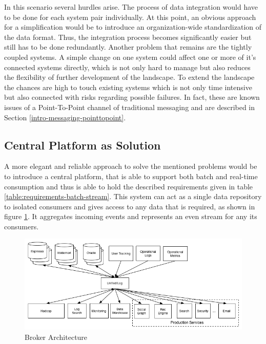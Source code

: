 In this scenario several hurdles arise. The process of data integration would
have to be done for each system pair individually. At this point, an obvious
approach for a simplification would be to introduce an organization-wide
standardization of the data format. Thus, the integration process becomes 
significantly easier but still has to be done redundantly. Another problem that
remains are the tightly coupled systems. A simple change on one system could
affect one or more of it's connected systems directly, which is not only hard to
manage but also reduces the flexibility of further development of the landscape.
To extend the landscape the chances are high to touch existing systems which is
not only time intensive but also connected with risks regarding possible
failures. In fact, these are known issues of a Point-To-Point channel of
traditional messaging and are described in Section
\ref{intro-messaging-pointtopoint}.

\subsection{Central Platform as Solution}
\label{intro-datastream-centralplatform}
A more elegant and reliable approach to solve the mentioned problems would be to
introduce a central platform, that is able to support both batch and real-time
consumption and thus is able to hold the described requirements given in table
\ref{table:requirements-batch-stream}. This system can act as a single
data repository to isolated consumers and gives access to any data that is
required, as shown in figure \ref{fig:datapipeline_simple}. It aggregates
incoming events and represents an even stream for any its consumers. 

\begin{figure}[H]
    \centering
    \includegraphics[width=1.0\textwidth]{images/datapipeline_simple.png}
    \caption{Broker Architecture}
    \label{fig:datapipeline_simple}
\end{figure}


